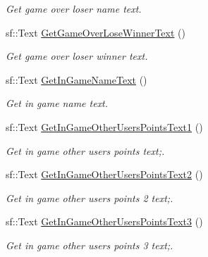 \begin{DoxyCompactItemize}
\begin{DoxyCompactList}\small\item\em Get game over loser name text. \end{DoxyCompactList}\item 
\mbox{\label{class_scene_a783b5b7ba01a4acc1484cc1536c7ecd8}} 
sf\+::\+Text \hyperlink{class_scene_a783b5b7ba01a4acc1484cc1536c7ecd8}{Get\+Game\+Over\+Lose\+Winner\+Text} ()
\begin{DoxyCompactList}\small\item\em Get game over loser winner text. \end{DoxyCompactList}\item 
\mbox{\label{class_scene_ae0e6d7336865ab34f7bf7dfcfbf7ec8a}} 
sf\+::\+Text \hyperlink{class_scene_ae0e6d7336865ab34f7bf7dfcfbf7ec8a}{Get\+In\+Game\+Name\+Text} ()
\begin{DoxyCompactList}\small\item\em Get in game name text. \end{DoxyCompactList}\item 
\mbox{\label{class_scene_a6310c6c3e49cee3e2a95b2348a502411}} 
sf\+::\+Text \hyperlink{class_scene_a6310c6c3e49cee3e2a95b2348a502411}{Get\+In\+Game\+Other\+Users\+Points\+Text1} ()
\begin{DoxyCompactList}\small\item\em Get in game other users points text;. \end{DoxyCompactList}\item 
\mbox{\label{class_scene_a7ca8a4fd01af145d9bdf159832aeb7a6}} 
sf\+::\+Text \hyperlink{class_scene_a7ca8a4fd01af145d9bdf159832aeb7a6}{Get\+In\+Game\+Other\+Users\+Points\+Text2} ()
\begin{DoxyCompactList}\small\item\em Get in game other users points 2 text;. \end{DoxyCompactList}\item 
\mbox{\label{class_scene_aef2f52b7403879bf76ddb4d614249960}} 
sf\+::\+Text \hyperlink{class_scene_aef2f52b7403879bf76ddb4d614249960}{Get\+In\+Game\+Other\+Users\+Points\+Text3} ()
\begin{DoxyCompactList}\small\item\em Get in game other users points 3 text;. \end{DoxyCompactList}\item 

\end{DoxyCompactItemize}
